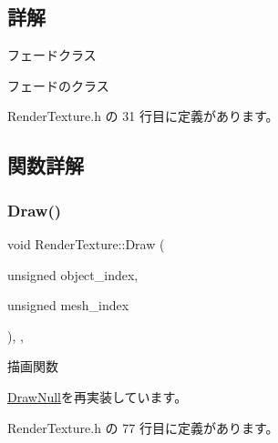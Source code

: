 \subsection{詳解}
フェードクラス 

フェードのクラス 

 Render\+Texture.\+h の 31 行目に定義があります。



\subsection{関数詳解}
\mbox{\label{class_render_texture_a529ab829c676470ae5764b42cba9efb0}} 
\subsubsection{\texorpdfstring{Draw()}{Draw()}}
{\footnotesize\ttfamily void Render\+Texture\+::\+Draw (\begin{DoxyParamCaption}\item[{unsigned}]{object\+\_\+index,  }\item[{unsigned}]{mesh\+\_\+index }\end{DoxyParamCaption})\hspace{0.3cm}{\ttfamily [inline]}, {\ttfamily [override]}, {\ttfamily [virtual]}}



描画関数 



\mbox{\hyperlink{class_draw_null_afe50f6fd820b18d673f70f048743f339}{Draw\+Null}}を再実装しています。



 Render\+Texture.\+h の 77 行目に定義があります。

